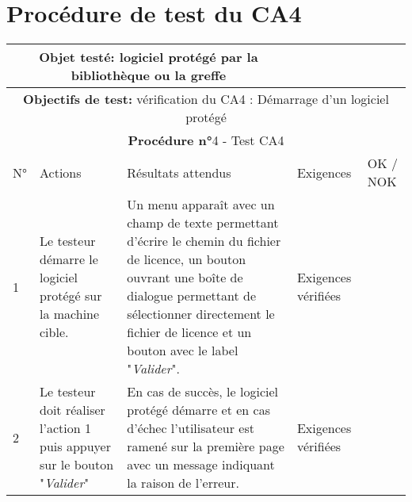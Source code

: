 \section*{Procédure de test du CA4}
\begin{table}[!h]
        \centering
        \begin{tabular}{|m{0.6cm}|
                         >{\raggedright\arraybackslash}m{4cm}|
                         >{\raggedright\arraybackslash}m{6.4cm}|
                         >{\raggedright\arraybackslash}m{2cm}|
                         m{1cm}|}
            \hline
            \multicolumn{3}{|c|}{
                \textbf{Objet testé: } logiciel protégé par la bibliothèque ou la greffe
            } & \multicolumn{2}{|c|}{
                \textbf{Version: } version    
            } \\
            \hline
            \multicolumn{5}{|c|}{\textbf{Objectifs de test:}
                vérification du CA4 : Démarrage d'un logiciel protégé} \\
            \hline
            \multicolumn{5}{|c|}{
                \textbf{Procédure n°}4 - Test CA4 
            } \\
            \hline
            N° & Actions & Résultats attendus & Exigences & OK / NOK \\
            \hline      %
            1 & Le testeur démarre le logiciel protégé sur la machine
                cible. 
              & Un menu apparaît avec un champ de texte permettant d'écrire
                le chemin du fichier de licence, un bouton ouvrant une 
                boîte de dialogue permettant de sélectionner directement 
                le fichier de licence et un bouton avec le label "\emph{Valider}". 
              & Exigences vérifiées & \\
            \hline
            2 & Le testeur doit réaliser l'action 1 puis appuyer sur le bouton
                "\emph{Valider}"
              & En cas de succès, le logiciel protégé démarre et en cas d'échec
                l'utilisateur est ramené sur la première page avec un message 
                indiquant la raison de l'erreur. 
              & Exigences vérifiées & \\
            \hline
        \end{tabular} 
        \label{tab:tab4}
\end{table}
\newpage

